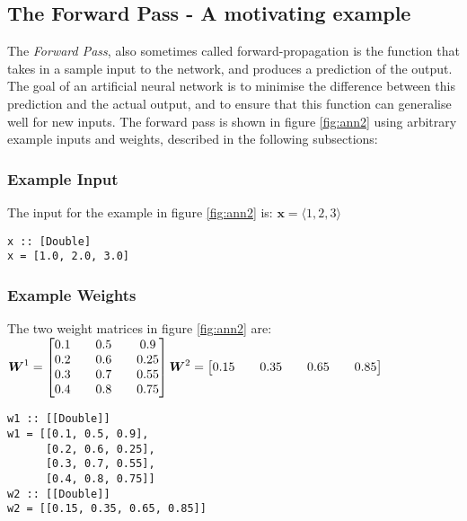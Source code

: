 \documentclass[a4paper]{article}
\begin{document}
\subsection{The Forward Pass - A motivating example}
The \textit{Forward Pass}, also sometimes called forward-propagation is the
function that takes in a sample input to the network, and produces
a prediction of the output. The goal of an artificial neural network is to 
minimise the difference between this prediction and the actual output, 
and to ensure that this function can generalise well for new inputs. The
forward pass is shown in figure \ref{fig:ann2} using arbitrary example inputs
and weights, described in the following subsections:
\subsubsection{Example Input}
The input for the example in figure \ref{fig:ann2} is:
$\boldsymbol{x} = \langle 1, 2, 3 \rangle$
\begin{verbatim}
x :: [Double]
x = [1.0, 2.0, 3.0]
\end{verbatim}
\subsubsection{Example Weights}
The two weight matrices in figure \ref{fig:ann2} are: \\
$\boldsymbol{W}^1 = 
  \begin{bmatrix}
       0.1 && 0.5 && 0.9  \\
       0.2 && 0.6 && 0.25 \\
       0.3 && 0.7 && 0.55 \\
       0.4 && 0.8 && 0.75 \\
  \end{bmatrix} \\
\boldsymbol{W}^2 =
  \begin{bmatrix}
  0.15 && 0.35 && 0.65 && 0.85
  \end{bmatrix}$
\begin{verbatim}
w1 :: [[Double]]
w1 = [[0.1, 0.5, 0.9],
      [0.2, 0.6, 0.25],
      [0.3, 0.7, 0.55],
      [0.4, 0.8, 0.75]]
w2 :: [[Double]]
w2 = [[0.15, 0.35, 0.65, 0.85]]
\end{verbatim}
\end{document}
